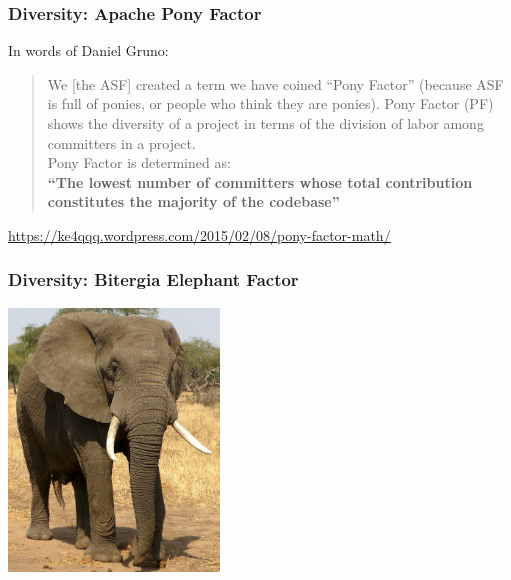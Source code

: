 \documentclass[17pt,aspectratio=169,hyperref=pdfusetitle]{beamer}
\begin{document}
\begin{frame}
\frametitle{Diversity: Apache Pony Factor}

{\large
In words of Daniel Gruno:
}
{\Large
\begin{quote}
  We [the ASF] created a term we have coined ``Pony Factor'' (because ASF is full of ponies, or people who think they are ponies). Pony Factor (PF) shows the diversity of a project in terms of the division of labor among committers in a project. \\
  \vspace{.5cm}
  Pony Factor is determined as: \\
  {\bf ``The lowest number of committers whose total contribution constitutes the majority of the codebase''} \\
\end{quote}
}
\begin{flushright}
  \url{https://ke4qqq.wordpress.com/2015/02/08/pony-factor-math/}
\end{flushright}
\end{frame}

\begin{frame}
\frametitle{Diversity: Bitergia Elephant Factor}

\begin{center}
\includegraphics[height=7cm]{figs/elephant}
\end{center}

\end{frame}
\end{document}
